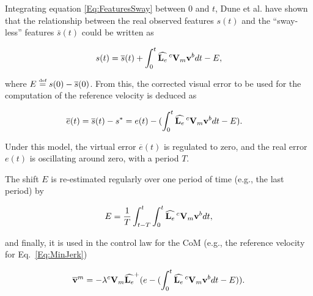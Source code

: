 

Integrating equation \ref{Eq:FeaturesSway} between $0$ and $t$, Dune et al. have shown that the relationship between the real observed features $s(t)$ and the ``sway-less'' features $\bar{s}(t)$ could be written as

\begin{equation}
s(t) = \overline{s}(t) + \int_{0}^{t} {{\widehat{\mathbf L_e}}} \, ^c \mathbf V_{m} \text{\bf v}^b dt - E,
\end{equation}

where $E \stackrel{\mbox{\tiny def}}{=} s(0)-\overline{s}(0)$. From this, the corrected visual error to be used for the computation of the reference velocity is deduced as

\begin{align}
\overline{e}(t)&=\overline{s}(t) -s^*= e(t) -  (\int_{0}^{t}{ {\widehat{\mathbf L_e}}} \, ^c \mathbf V_m \text{\bf v}^b dt -E).
\end{align}

Under this model, the virtual error $\overline{e}(t)$ is regulated to zero, and the real error $e(t)$ is oscillating around zero, with a period $T$. 

The shift $E$ is re-estimated regularly over one period of time (e.g., the last period) by 

$$
E= \frac{1}{T}\int_{t-T}^t\int_0^t { {\widehat{\mathbf L_e}}} \, ^c \mathbf V_m \text{\bf v}^b  dt,
$$ 

and finally, it is used in the control law for the CoM (e.g., the reference velocity for Eq.~\ref{Eq:MinJerk}) 

\begin{gather} 
\overline{\text{\bf v}}^m= -\lambda{ ^c \mathbf V_m {{ {\widehat{\mathbf L_e}}}}^{+}}(e -  (\int_{0}^{t}{{ {\widehat{\mathbf L_e}}}} \, ^c \mathbf V_{m}\text{\bf v}^b dt - E)).
\label{eq:avControlCom} 
\end{gather} 

